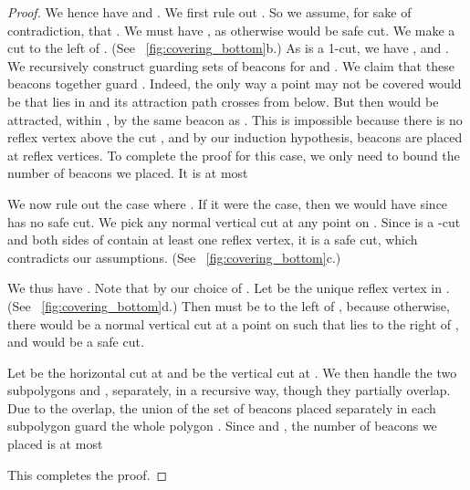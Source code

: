 \documentclass[11pt]{article}
\theoremstyle{definition}
\begin{document}
\begin{proof}
We hence have  and . We first rule out .
So we assume, for sake of contradiction, that . We must have , 
as otherwise  would be safe cut.
We make a cut  to the left of .  (See \figurename~\ref{fig:covering_bottom}b.)
As  is a 1-cut, we have , and . We recursively
construct guarding sets of beacons for  and . We claim that these
beacons together guard . Indeed, the only way a point  may not be covered would
be that  lies in  and its attraction path crosses  from below.
But then  would be attracted, within , by the same beacon as . This
is impossible because there is no reflex vertex above the cut , and by our induction
hypothesis, beacons are placed at reflex vertices. To complete the proof for
this case, we only need to bound the number of beacons we placed. It is at most
	

We now rule out the case where . 
If it were the case, then we would have  since  has no safe cut.
We pick any normal vertical cut  at any point on .
Since  is a -cut and both sides of  contain at least one reflex vertex,
it is a safe cut, which contradicts our assumptions.
(See \figurename~\ref{fig:covering_bottom}c.)

We thus have .
Note that  by our choice of .
Let  be the unique reflex vertex in .
(See \figurename~\ref{fig:covering_bottom}d.)
Then  must be to the left of , because
otherwise, 
there would be a normal vertical cut  at a point on 
such that  lies to the right of , and
 would be a safe cut.

Let  be the horizontal cut at  and  be the vertical cut at .
We then handle  the two subpolygons  and , separately, in a recursive way,
though they partially overlap.
Due to the overlap, the union of the set of beacons placed separately in each subpolygon
guard the whole polygon .
Since  and
,
the number of beacons we placed is at most

This completes the proof.
\end{proof}
\end{document}
